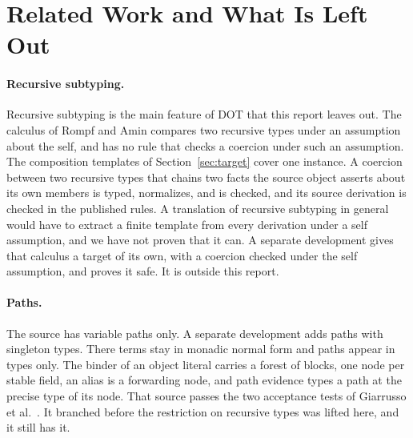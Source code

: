 \mathplain
\section{Related Work and What Is Left Out}\label{sec:related}

\paragraph{Recursive subtyping.}
Recursive subtyping is the main feature of DOT that this report leaves out. The calculus of Rompf and Amin \cite{rompf2016soundness} compares two recursive types under an assumption about the self, and \FCdot has no rule that checks a coercion under such an assumption. The composition templates of Section~\ref{sec:target} cover one instance. A coercion between two recursive types that chains two facts the source object asserts about its own members is typed, normalizes, and is checked, and its source derivation is checked in the published rules. A translation of recursive subtyping in general would have to extract a finite template from every derivation under a self assumption, and we have not proven that it can. A separate development gives that calculus a target of its own, with a coercion checked under the self assumption, and proves it safe. It is outside this report.

\paragraph{Paths.}
The source has variable paths only. A separate development adds paths with singleton types. There terms stay in monadic normal form and paths appear in types only. The binder of an object literal carries a forest of blocks, one node per stable field, an alias is a forwarding node, and path evidence types a path at the precise type of its node. That source passes the two acceptance tests of Giarrusso et al.\ \cite{giarrusso2020scala}. It branched before the restriction on recursive types was lifted here, and it still has it.

